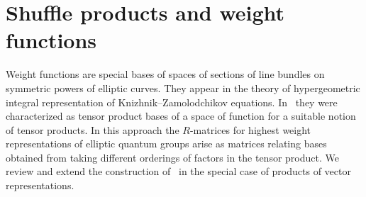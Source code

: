 \documentclass[pdftex]{sigma}
\numberwithin{equation}{section}
\begin{document}
\section{Shuffle products and weight functions}\label{s-3}
Weight functions are special bases of spaces of sections of line bundles on symmetric powers of elliptic curves. They appear in the theory of hypergeometric integral representation of Knizhnik--Zamolodchikov equations. In~\cite{FelderTarasovVarchenko1997} they were characterized as tensor product bases of a space of function for a suitable notion of tensor products. In this approach the $R$-matrices for highest weight representations of elliptic quantum groups arise as matrices relating bases obtained from taking different orderings of factors in the tensor product. We review and extend the construction of~\cite{FelderTarasovVarchenko1997} in the special case of products of vector representations.
\end{document}

